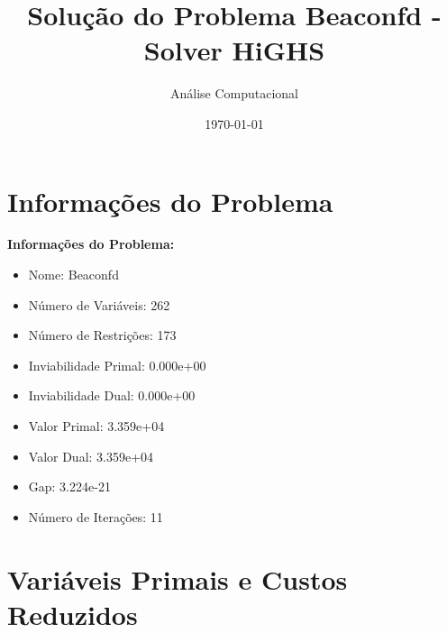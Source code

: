 \documentclass[12pt]{article}
\title{Solução do Problema Beaconfd - Solver HiGHS}
\author{Análise Computacional}
\date{\today}
\begin{document}
\maketitle

\section{Informações do Problema}

\textbf{Informações do Problema:}
\begin{itemize}
\item Nome: Beaconfd
\item Número de Variáveis: 262
\item Número de Restrições: 173
\item Inviabilidade Primal: 0.000e+00
\item Inviabilidade Dual: 0.000e+00
\item Valor Primal: 3.359e+04
\item Valor Dual: 3.359e+04
\item Gap: 3.224e-21
\item Número de Iterações: 11
\end{itemize}


\section{Variáveis Primais e Custos Reduzidos}
\end{document}
